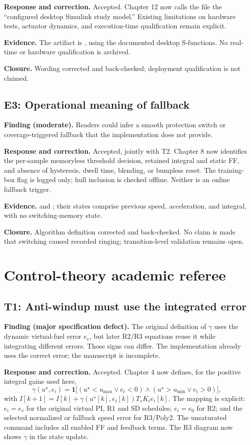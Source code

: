 \documentclass[11pt,a4paper]{article}
\newcommand{\finding}[2]{\subsection*{#1: #2}}
\begin{document}
\textbf{Response and correction.} Accepted. Chapter 12 now calls the file the ``configured desktop Simulink study model.'' Existing limitations on hardware tests, actuator dynamics, and execution-time qualification remain explicit.

\textbf{Evidence.} The artifact is , using the documented desktop S-functions. No real-time or hardware qualification is archived.

\textbf{Closure.} Wording corrected and back-checked; deployment qualification is not claimed.

\finding{E3}{Operational meaning of fallback}
\textbf{Finding (moderate).} Readers could infer a smooth protection switch or coverage-triggered fallback that the implementation does not provide.

\textbf{Response and correction.} Accepted, jointly with T2. Chapter 8 now identifies the per-sample memoryless threshold decision, retained integral and static FF, and absence of hysteresis, dwell time, blending, or bumpless reset. The training-box flag is logged only; hull inclusion is checked offline. Neither is an online fallback trigger.

\textbf{Evidence.}  and ; their states comprise previous speed, acceleration, and integral, with no switching-memory state.

\textbf{Closure.} Algorithm definition corrected and back-checked. No claim is made that switching caused recorded ringing; transition-level validation remains open.

\clearpage
\section*{Control-theory academic referee}
\finding{T1}{Anti-windup must use the integrated error}
\textbf{Finding (major specification defect).} The original definition of $\gamma$ uses the dynamic virtual-fuel error $e_v$, but later R2/R3 equations reuse it while integrating different errors. Those signs can differ. The implementation already uses the correct error; the manuscript is incomplete.

\textbf{Response and correction.} Accepted. Chapter 4 now defines, for the positive integral gains used here,
\begin{equation*}
\gamma(u^\star,e_i)=\mathbf1\big[(u^\star<u_{\max}\lor e_i<0)
\land(u^\star>u_{\min}\lor e_i>0)\big],
\end{equation*}
with $I[k+1]=I[k]+\gamma(u^\star[k],e_i[k])T_sK_i e_i[k]$. The mapping is explicit: $e_i=e_v$ for the original virtual PI, R1 and SD schedules; $e_i=e_0$ for R2; and the selected normalized or fallback speed error for R3/Poly2. The unsaturated command includes all enabled FF and feedback terms. The R3 diagram now shows $\gamma$ in the state update.
\end{document}
